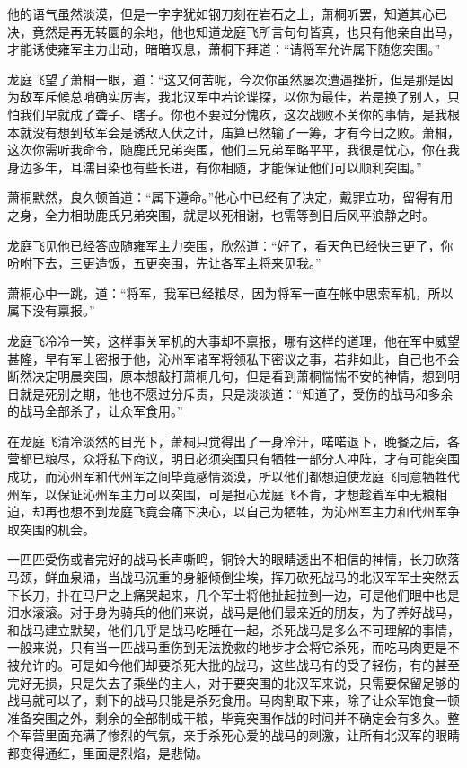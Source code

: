 他的语气虽然淡漠，但是一字字犹如钢刀刻在岩石之上，萧桐听罢，知道其心已决，竟然是再无转圜的余地，他也知道龙庭飞所言句句皆真，也只有他亲自出马，才能诱使雍军主力出动，暗暗叹息，萧桐下拜道：“请将军允许属下随您突围。”

龙庭飞望了萧桐一眼，道：“这又何苦呢，今次你虽然屡次遭遇挫折，但是那是因为敌军斥候总哨确实厉害，我北汉军中若论谍探，以你为最佳，若是换了别人，只怕我们早就成了聋子、瞎子。你也不要过分愧疚，这次战败不关你的事情，是我根本就没有想到敌军会是诱敌入伏之计，庙算已然输了一筹，才有今日之败。萧桐，这次你需听我命令，随鹿氏兄弟突围，他们三兄弟军略平平，我很是忧心，你在我身边多年，耳濡目染也有些长进，有你相随，才能保证他们可以顺利突围。”

萧桐默然，良久顿首道：“属下遵命。”他心中已经有了决定，戴罪立功，留得有用之身，全力相助鹿氏兄弟突围，就是以死相谢，也需等到日后风平浪静之时。

龙庭飞见他已经答应随雍军主力突围，欣然道：“好了，看天色已经快三更了，你吩咐下去，三更造饭，五更突围，先让各军主将来见我。”

萧桐心中一跳，道：“将军，我军已经粮尽，因为将军一直在帐中思索军机，所以属下没有禀报。”

龙庭飞冷冷一笑，这样事关军机的大事却不禀报，哪有这样的道理，他在军中威望甚隆，早有军士密报于他，沁州军诸军将领私下密议之事，若非如此，自己也不会断然决定明晨突围，原本想敲打萧桐几句，但是看到萧桐惴惴不安的神情，想到明日就是死别之期，他也不愿过分斥责，只是淡淡道：“知道了，受伤的战马和多余的战马全部杀了，让众军食用。”

在龙庭飞清冷淡然的目光下，萧桐只觉得出了一身冷汗，喏喏退下，晚餐之后，各营都已粮尽，众将私下商议，明日必须突围只有牺牲一部分人冲阵，才有可能突围成功，而沁州军和代州军之间毕竟感情淡漠，所以他们都想迫使龙庭飞同意牺牲代州军，以保证沁州军主力可以突围，可是担心龙庭飞不肯，才想趁着军中无粮相迫，却再也想不到龙庭飞竟会痛下决心，以自己为牺牲，为沁州军主力和代州军争取突围的机会。

一匹匹受伤或者完好的战马长声嘶鸣，铜铃大的眼睛透出不相信的神情，长刀砍落马颈，鲜血泉涌，当战马沉重的身躯倾倒尘埃，挥刀砍死战马的北汉军军士突然丢下长刀，扑在马尸之上痛哭起来，几个军士将他扯起拉到一边，可是他们眼中也是泪水滚滚。对于身为骑兵的他们来说，战马是他们最亲近的朋友，为了养好战马，和战马建立默契，他们几乎是战马吃睡在一起，杀死战马是多么不可理解的事情，一般来说，只有当一匹战马重伤到无法挽救的地步才会将它杀死，而吃马肉更是不被允许的。可是如今他们却要杀死大批的战马，这些战马有的受了轻伤，有的甚至完好无损，只是失去了乘坐的主人，对于要突围的北汉军来说，只需要保留足够的战马就可以了，剩下的战马只能是杀死食用。马肉割取下来，除了让众军饱食一顿准备突围之外，剩余的全部制成干粮，毕竟突围作战的时间并不确定会有多久。整个军营里面充满了惨烈的气氛，亲手杀死心爱的战马的刺激，让所有北汉军的眼睛都变得通红，里面是烈焰，是悲恸。

